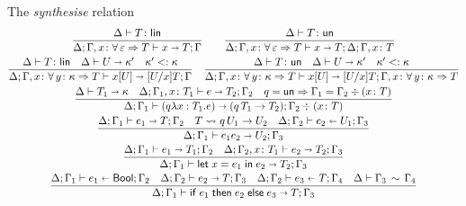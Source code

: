 \begin{figure}[h!]
  The \emph{synthesise} relation\hfill{}
  \begin{gather*}
    \frac{
      \isLin T
    }{
      \algtypeout[\kindEnv;\varEnv, x\colon \tForall \Empty T] x T \varEnv
    }
    \qquad
    \frac{
      \isUn T
    }{
      \algtypeout[\kindEnv;\varEnv, x\colon \tForall \Empty T] x T {\kindEnv;\varEnv, x\colon T}
    }
    \\
    \frac{
      \isLin T
      \quad
      \algkindout U {\kind'}
      \quad
      \subkind{\kind'}{\kind}
    }{
      \algtypeout[\kindEnv;\varEnv,x\colon\tForall{y\colon\kind}{T}]{x[U]}{\subs U x T}{\varEnv}
    }
    \quad
    \frac{
      \isUn T
      \quad
      \algkindout U {\kind'}
      \quad
      \subkind{\kind'}{\kind}
    }{
      \algtypeout[\kindEnv;\varEnv,x\colon\tForall{y\colon\kind}{T}]{x[U]}{\subs
        U x T}{\varEnv,x\colon\tForall{y\colon\kind}{T}}
      }
    \\
    \frac{
      \algkindout{T_1} \kind
      \quad
      \algtypeout[\kindEnv;\varEnv_1,x\colon T_1]{e}{T_2}{\varEnv_2}
      \quad
      q=\unk \Rightarrow \varEnv_1 = \varEnv_2 \div (x\colon T)
    }{
      \algtypeout[\kindEnv;\varEnv_1]{(q\lambda x:T_1.e)}{(q\,T_1 \rightarrow T_2)}{\varEnv_2 \div (x\colon T)}
    }
    \\
    \frac{
      \algtypeout[\kindEnv;\varEnv_1]{e_1}{T}{\varEnv_2}
      \quad
      T \Extract{} q\,U_1\rightarrow U_2
      \quad
      \algtypein[\kindEnv;\varEnv_2]{e_2}{U_1}{\varEnv_3}
    }{
      \algtypeout[\kindEnv;\varEnv_1]{e_1e_2}{U_2}{\varEnv_3}
    }
    \\
    \frac{
      \algtypeout[\kindEnv;\varEnv_1]{e_1}{T_1}{\varEnv_2}
      \quad
      \algtypeout[\kindEnv;\varEnv_2,x\colon T_1]{e_2}{T_2}{\Gamma_3}
    }{
      \algtypeout[\kindEnv;\varEnv_1]{\unlete{x}{e_1}{e_2}}{T_2}{\varEnv_3}
    }
    \\
    \frac{
      \algtypein[\kindEnv;\varEnv_1]{e_1}{\boole}{\varEnv_2}
      \quad
      \algtypeout[\kindEnv;\varEnv_2]{e_2}{T}{\varEnv_3}
      \quad
      \algtypein[\kindEnv;\varEnv_2]{e_3}{T}{\varEnv_4}
      \quad
      \ctxequiv{\varEnv_3}{\varEnv_4}
    }{
      \algtypeout[\kindEnv;\varEnv_1]{\conditionale{e_1}{e_2}{e_3}}{T}{\varEnv_3}
    }
    \\

\end{gather*}
\end{figure}
